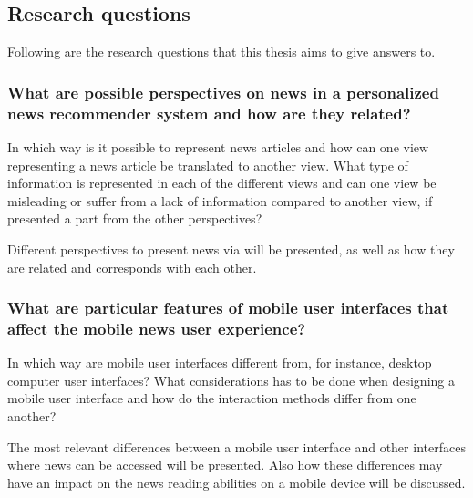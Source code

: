 \subsection{Research questions}
Following are the research questions that this thesis aims to give answers to.

\subsubsection{What are possible perspectives on news in a personalized news recommender system and how are they related?}

In which way is it possible to represent news articles and how can one view representing a news article be translated to another view. What type of information is represented in each of the different views and can one view be misleading or suffer from a lack of information compared to another view, if presented a part from the other perspectives?

Different perspectives to present news via will be presented, as well as how they are related and corresponds with each other. 



\subsubsection{What are particular features of mobile user interfaces that affect the mobile news user experience?}

In which way are mobile user interfaces different from, for instance, desktop computer user interfaces? What considerations has to be done when designing a mobile user interface and how do the interaction methods differ from one another?

The most relevant differences between a mobile user interface and other interfaces where news can be accessed will be presented. Also how these differences may have an impact on the news reading abilities on a mobile device will be discussed.


